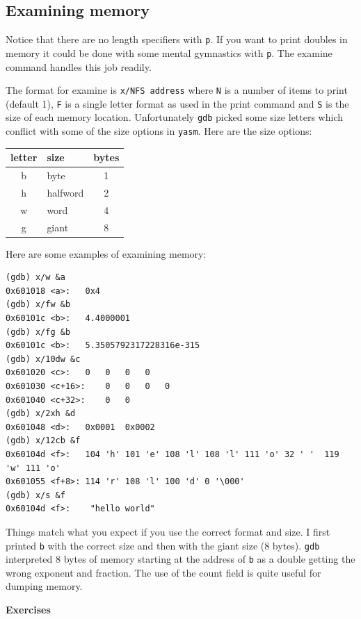 \documentclass[11pt,b5paper]{book}
\begin{document}
\subsection{Examining memory}

Notice that there are no length specifiers with {\tt p}. 
If you want to print doubles in memory it could be done with some mental gymnastics with {\tt p}.
The examine command handles this job readily.

The format for examine is {\tt x/NFS address} where {\tt N} is a number of items
to print (default 1), {\tt F} is a single letter format as used in the print
command and {\tt S} is the size of each memory location.
Unfortunately {\tt gdb} picked some size letters which conflict with
some of the size options in {\tt yasm}.
Here are the size options:
\begin{center}
\begin{tabular}{|c|l|c|}
\hline
letter & size & bytes \\
\hline
b      & byte & 1 \\
\hline
h 		& halfword & 2 \\
\hline
w     & word & 4 \\
\hline
g     & giant & 8 \\
\hline
\end{tabular}
\end{center}

Here are some examples of examining memory:
\begin{verbatim}
(gdb) x/w &a
0x601018 <a>:	0x4
(gdb) x/fw &b
0x60101c <b>:	4.4000001
(gdb) x/fg &b
0x60101c <b>:	5.3505792317228316e-315
(gdb) x/10dw &c
0x601020 <c>:	0	0	0	0
0x601030 <c+16>:	0	0	0	0
0x601040 <c+32>:	0	0
(gdb) x/2xh &d
0x601048 <d>:	0x0001	0x0002
(gdb) x/12cb &f
0x60104d <f>:	104 'h'	101 'e'	108 'l'	108 'l'	111 'o'	32 ' '	119 'w'	111 'o'
0x601055 <f+8>:	114 'r'	108 'l'	100 'd'	0 '\000'
(gdb) x/s &f
0x60104d <f>:	 "hello world"
\end{verbatim}

Things match what you expect if you use the correct format and size.
I first printed {\tt b} with the correct size and then with the giant size (8 bytes).
{\tt gdb} interpreted 8 bytes of memory starting at the address of {\tt b} 
as a double getting the wrong exponent and fraction.
The use of the count field is quite useful for dumping memory.

\vfill
\break
{\bf\large Exercises}
\end{document}
